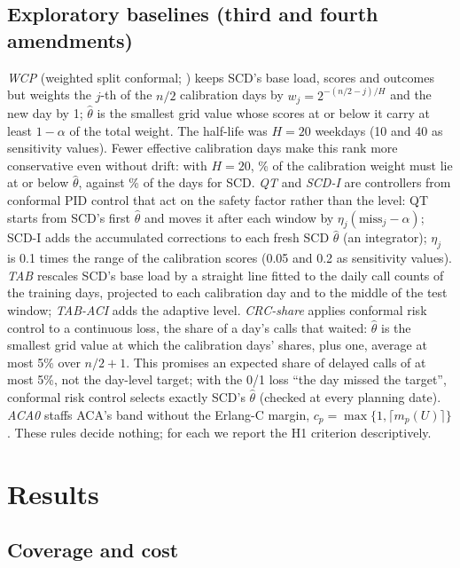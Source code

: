 \documentclass[12pt]{article}
\begin{document}
\subsection{Exploratory baselines (third and fourth amendments)}

\emph{WCP} (weighted split conformal; \citealp{barber2023beyond}) keeps SCD's base load, scores and outcomes but weights the $j$-th of the $n/2$ calibration days by $w_j=2^{-(n/2-j)/H}$ and the new day by 1; $\hat\theta$ is the smallest grid value whose scores at or below it carry at least $1-\alpha$ of the total weight. The half-life was $H=20$ weekdays (10 and 40 as sensitivity values). Fewer effective calibration days make this rank more conservative even without drift: with $H=20$, \% of the calibration weight must lie at or below $\hat\theta$, against \% of the days for SCD. \emph{QT} and \emph{SCD-I} are controllers from conformal PID control \citep{angelopoulos2023pid} that act on the safety factor rather than the level: QT starts from SCD's first $\hat\theta$ and moves it after each window by $\eta_j(\text{miss}_j-\alpha)$; SCD-I adds the accumulated corrections to each fresh SCD $\hat\theta$ (an integrator); $\eta_j$ is 0.1 times the range of the calibration scores (0.05 and 0.2 as sensitivity values). \emph{TAB} rescales SCD's base load by a straight line fitted to the daily call counts of the training days, projected to each calibration day and to the middle of the test window; \emph{TAB-ACI} adds the adaptive level. \emph{CRC-share} applies conformal risk control \citep{angelopoulos2024conformal} to a continuous loss, the share of a day's calls that waited: $\hat\theta$ is the smallest grid value at which the calibration days' shares, plus one, average at most 5\% over $n/2+1$. This promises an expected share of delayed calls of at most 5\%, not the day-level target; with the 0/1 loss ``the day missed the target'', conformal risk control selects exactly SCD's $\hat\theta$ (checked at every planning date). \emph{ACA0} staffs ACA's band without the Erlang-C margin, $c_p=\max\{1,\lceil m_p(U)\rceil\}$. These rules decide nothing; for each we report the H1 criterion descriptively.

\section{Results}

\subsection{Coverage and cost}
\end{document}
